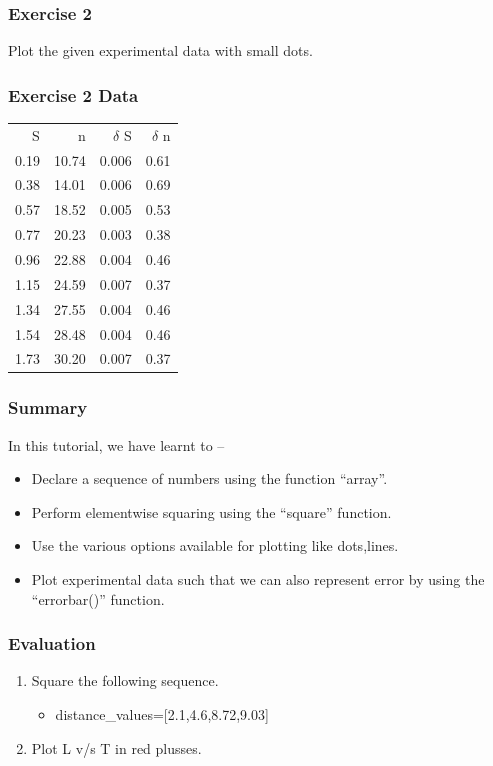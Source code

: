 \documentclass[presentation]{beamer}
\begin{document}
\begin{frame}
\frametitle{Exercise 2}
\label{sec-6}

  Plot the given experimental data with small dots.     
\end{frame}
\begin{frame}
\frametitle{Exercise 2 Data}
\label{sec-7}




\begin{center}
\begin{tabular}{rrrr}
    S  &      n  &  $\delta$ S  &  $\delta$ n  \\
 0.19  &  10.74  &       0.006  &        0.61  \\
 0.38  &  14.01  &       0.006  &        0.69  \\
 0.57  &  18.52  &       0.005  &        0.53  \\
 0.77  &  20.23  &       0.003  &        0.38  \\
 0.96  &  22.88  &       0.004  &        0.46  \\
 1.15  &  24.59  &       0.007  &        0.37  \\
 1.34  &  27.55  &       0.004  &        0.46  \\
 1.54  &  28.48  &       0.004  &        0.46  \\
 1.73  &  30.20  &       0.007  &        0.37  \\
\end{tabular}
\end{center}


  
\end{frame}
\begin{frame}
\frametitle{Summary}
\label{sec-8}

  In this tutorial, we have learnt to –

\begin{itemize}
\item Declare a sequence of numbers using the function ``array''.
\item Perform elementwise squaring using the ``square'' function.
\item Use the various options available for plotting like dots,lines.
\item Plot experimental data such that we can also represent error by using the
    ``errorbar()'' function.
\end{itemize}
\end{frame}
\begin{frame}
\frametitle{Evaluation}
\label{sec-9}


\begin{enumerate}
\item Square the following sequence.
\begin{itemize}
\item distance\_values=[2.1,4.6,8.72,9.03]
\end{itemize}
\vspace{8pt}
\item Plot L v/s T in red plusses.
\end{enumerate}
\end{frame}
\end{document}
